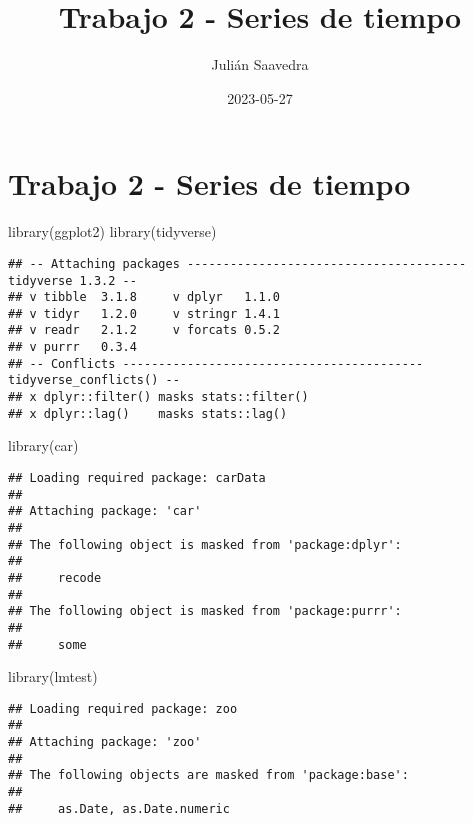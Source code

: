 \documentclass[
]{article}
\title{Trabajo 2 - Series de tiempo}
\author{Julián Saavedra}
\date{2023-05-27}
\newenvironment{Shaded}{\begin{snugshade}}{\end{snugshade}}
\newcommand{\FunctionTok}[1]{\textcolor[rgb]{0.00,0.00,0.00}{#1}}
\newcommand{\NormalTok}[1]{#1}
\begin{document}
\maketitle

\hypertarget{trabajo-2---series-de-tiempo}{%
\section{Trabajo 2 - Series de
tiempo}\label{trabajo-2---series-de-tiempo}}

\begin{Shaded}
\begin{Highlighting}[]
\FunctionTok{library}\NormalTok{(ggplot2)}
\FunctionTok{library}\NormalTok{(tidyverse)}
\end{Highlighting}
\end{Shaded}

\begin{verbatim}
## -- Attaching packages --------------------------------------- tidyverse 1.3.2 --
## v tibble  3.1.8     v dplyr   1.1.0
## v tidyr   1.2.0     v stringr 1.4.1
## v readr   2.1.2     v forcats 0.5.2
## v purrr   0.3.4     
## -- Conflicts ------------------------------------------ tidyverse_conflicts() --
## x dplyr::filter() masks stats::filter()
## x dplyr::lag()    masks stats::lag()
\end{verbatim}

\begin{Shaded}
\begin{Highlighting}[]
\FunctionTok{library}\NormalTok{(car)}
\end{Highlighting}
\end{Shaded}

\begin{verbatim}
## Loading required package: carData
## 
## Attaching package: 'car'
## 
## The following object is masked from 'package:dplyr':
## 
##     recode
## 
## The following object is masked from 'package:purrr':
## 
##     some
\end{verbatim}

\begin{Shaded}
\begin{Highlighting}[]
\FunctionTok{library}\NormalTok{(lmtest)}
\end{Highlighting}
\end{Shaded}

\begin{verbatim}
## Loading required package: zoo
## 
## Attaching package: 'zoo'
## 
## The following objects are masked from 'package:base':
## 
##     as.Date, as.Date.numeric
\end{verbatim}
\end{document}
